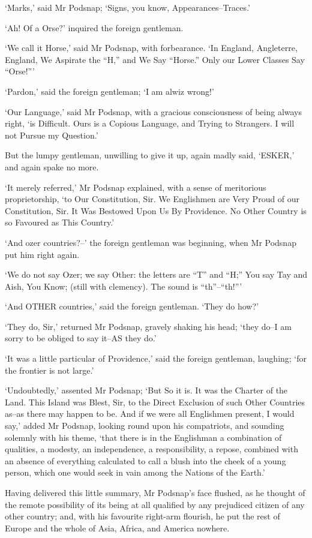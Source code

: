 ‘Marks,’ said Mr Podsnap; ‘Signs, you know, Appearances--Traces.’

‘Ah! Of a Orse?’ inquired the foreign gentleman.

‘We call it Horse,’ said Mr Podsnap, with forbearance. ‘In England,
Angleterre, England, We Aspirate the “H,” and We Say “Horse.” Only our
Lower Classes Say “Orse!”’

‘Pardon,’ said the foreign gentleman; ‘I am alwiz wrong!’

‘Our Language,’ said Mr Podsnap, with a gracious consciousness of being
always right, ‘is Difficult. Ours is a Copious Language, and Trying to
Strangers. I will not Pursue my Question.’

But the lumpy gentleman, unwilling to give it up, again madly said,
‘ESKER,’ and again spake no more.

‘It merely referred,’ Mr Podsnap explained, with a sense of meritorious
proprietorship, ‘to Our Constitution, Sir. We Englishmen are Very Proud
of our Constitution, Sir. It Was Bestowed Upon Us By Providence. No
Other Country is so Favoured as This Country.’

‘And ozer countries?--’ the foreign gentleman was beginning, when Mr
Podsnap put him right again.

‘We do not say Ozer; we say Other: the letters are “T” and “H;” You say
Tay and Aish, You Know; (still with clemency). The sound is “th”--“th!”’

‘And OTHER countries,’ said the foreign gentleman. ‘They do how?’

‘They do, Sir,’ returned Mr Podsnap, gravely shaking his head; ‘they
do--I am sorry to be obliged to say it--AS they do.’

‘It was a little particular of Providence,’ said the foreign gentleman,
laughing; ‘for the frontier is not large.’

‘Undoubtedly,’ assented Mr Podsnap; ‘But So it is. It was the Charter
of the Land. This Island was Blest, Sir, to the Direct Exclusion of
such Other Countries as--as there may happen to be. And if we were all
Englishmen present, I would say,’ added Mr Podsnap, looking round upon
his compatriots, and sounding solemnly with his theme, ‘that there is in
the Englishman a combination of qualities, a modesty, an independence,
a responsibility, a repose, combined with an absence of everything
calculated to call a blush into the cheek of a young person, which one
would seek in vain among the Nations of the Earth.’

Having delivered this little summary, Mr Podsnap’s face flushed, as he
thought of the remote possibility of its being at all qualified by
any prejudiced citizen of any other country; and, with his favourite
right-arm flourish, he put the rest of Europe and the whole of Asia,
Africa, and America nowhere.

